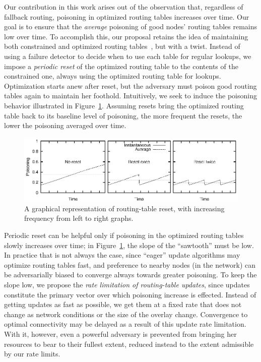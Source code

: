 \documentclass[10pt,twocolumn]{article}
\begin{document}
\label{sec:design}
Our contribution in this work arises out of the observation that,
regardless of fallback routing, poisoning in optimized routing tables
increases over time.  Our goal is to ensure that the \emph{average}
poisoning of good nodes' routing tables remains low over time.  To
accomplish this, 
our proposal retains the idea of maintaining both constrained and
optimized routing tables~\cite{Castro2002}, but with a twist.  Instead
of using a failure detector to decide when to
use each table for regular lookups, we impose a
\emph{periodic reset} of the optimized routing table to the contents of the
constrained one, always using the optimized routing table for lookups.
Optimization starts anew after reset, but the adversary must poison
good routing tables again to maintain her foothold.  Intuitively,
we seek to induce the poisoning behavior illustrated in
Figure~\ref{fig:sawtooth}.  Assuming resets bring the optimized routing
table back to its baseline level of poisoning, the more frequent the
resets, the lower the poisoning averaged over time.

\begin{figure}
\centerline{\includegraphics{graphs/equations/sawtooth}}
\caption{A graphical representation of routing-table reset, with
  increasing frequency from left to right graphs.} 
\label{fig:sawtooth}
\end{figure}

Periodic reset can be helpful only if poisoning in the optimized
routing tables slowly increases over time; in Figure~\ref{fig:sawtooth}, the
slope of the ``sawtooth'' must be low.  In practice that is not always
the case, since ``eager'' update algorithms may optimize routing tables
fast, and preference to nearby nodes (in the network) can be
adversarially biased to converge always towards
greater poisoning.  To keep the slope low, we 
propose the \emph{rate limitation of routing-table updates}, since updates 
constitute the primary vector over which poisoning increase
is effected.  Instead of getting updates as fast as possible, we get
them at a fixed rate that does not change as network conditions or the
size of the overlay change.   Convergence to optimal connectivity
may be delayed as a result of this update rate limitation.  With it,
however, even a powerful adversary is prevented from bringing her
resources to bear to their fullest extent, reduced instead to the extent
admissible by our rate limits.
\end{document}
